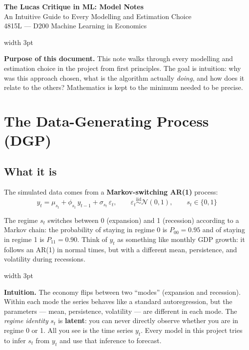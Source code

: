 \documentclass[11pt, a4paper]{article}
\newenvironment{intubox}{%
  \vspace{4pt}\par\noindent%
  {\color{darkblue}\vrule width 3pt}\hspace{6pt}%
  \begin{minipage}{\dimexpr\linewidth-9pt\relax}\vspace{2pt}%
}{%
  \vspace{2pt}\end{minipage}\par\vspace{4pt}%
}
\newenvironment{notebox}{%
  \vspace{4pt}\par\noindent%
  {\color{gold}\vrule width 3pt}\hspace{6pt}%
  \begin{minipage}{\dimexpr\linewidth-9pt\relax}\vspace{2pt}%
}{%
  \vspace{2pt}\end{minipage}\par\vspace{4pt}%
}
\begin{document}
\begin{center}
  {\LARGE\bfseries\color{darkblue} The Lucas Critique in ML: Model Notes}\\[6pt]
  {\large An Intuitive Guide to Every Modelling and Estimation Choice}\\[4pt]
  {\normalsize 4815L \quad --- \quad D200 Machine Learning in Economics}
\end{center}

\medskip

\begin{notebox}
\textbf{Purpose of this document.}
This note walks through every modelling and estimation choice in the project
from first principles. The goal is intuition: why was this approach chosen,
what is the algorithm actually \emph{doing}, and how does it relate to the
others? Mathematics is kept to the minimum needed to be precise.
\end{notebox}

\tableofcontents

\newpage

\section{The Data-Generating Process (DGP)}
\label{sec:dgp}

\subsection{What it is}

The simulated data comes from a \textbf{Markov-switching AR(1)} process:
\[
  y_t = \mu_{s_t} + \phi_{s_t}\,y_{t-1} + \sigma_{s_t}\,\varepsilon_t,
  \qquad \varepsilon_t \overset{\text{iid}}{\sim} \mathcal{N}(0,1),
  \qquad s_t \in \{0,1\}
\]

The regime $s_t$ switches between 0 (expansion) and 1 (recession) according
to a Markov chain: the probability of staying in regime 0 is $P_{00}=0.95$ and
of staying in regime 1 is $P_{11}=0.90$. Think of $y_t$ as something like
monthly GDP growth: it follows an AR(1) in normal times, but with a different
mean, persistence, and volatility during recessions.

\begin{intubox}
\textbf{Intuition.}
The economy flips between two ``modes'' (expansion and recession). Within each
mode the series behaves like a standard autoregression, but the parameters ---
mean, persistence, volatility --- are different in each mode. The \emph{regime
identity} $s_t$ is \textbf{latent}: you can never directly observe whether you
are in regime 0 or 1. All you see is the time series $y_t$. Every model in this
project tries to infer $s_t$ from $y_t$ and use that inference to forecast.
\end{intubox}
\end{document}
